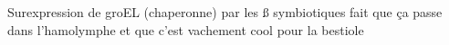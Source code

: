 Surexpression de groEL (chaperonne) par les ß symbiotiques fait que ça passe dans l'hamolymphe et que c'est vachement cool pour la bestiole